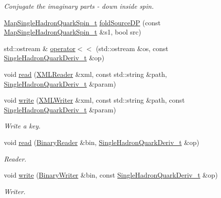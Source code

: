 \begin{DoxyCompactItemize}
\begin{DoxyCompactList}\small\item\em Conjugate the imaginary parts -\/ down inside spin. \end{DoxyCompactList}\item 
\mbox{\hyperlink{namespaceHadron_a22279e56b59508dc8dd2c8991dc911fd}{Map\+Single\+Hadron\+Quark\+Spin\+\_\+t}} \mbox{\hyperlink{namespaceHadron_a3ea046027140669df443a45763de3e2c}{fold\+Source\+DP}} (const \mbox{\hyperlink{namespaceHadron_a22279e56b59508dc8dd2c8991dc911fd}{Map\+Single\+Hadron\+Quark\+Spin\+\_\+t}} \&s1, bool src)
\item 
std\+::ostream \& \mbox{\hyperlink{namespaceHadron_af6547a2cdd6369eda030067e469096bf}{operator$<$$<$}} (std\+::ostream \&os, const \mbox{\hyperlink{structHadron_1_1SingleHadronQuarkDeriv__t}{Single\+Hadron\+Quark\+Deriv\+\_\+t}} \&op)
\item 
void \mbox{\hyperlink{namespaceHadron_a0b9e3ade4af9d7765000d9cd6477956e}{read}} (\mbox{\hyperlink{classADATXML_1_1XMLReader}{X\+M\+L\+Reader}} \&xml, const std\+::string \&path, \mbox{\hyperlink{structHadron_1_1SingleHadronQuarkDeriv__t}{Single\+Hadron\+Quark\+Deriv\+\_\+t}} \&param)
\item 
void \mbox{\hyperlink{namespaceHadron_a2e0c9a892aa8790addf90c28db1eaf28}{write}} (\mbox{\hyperlink{classADATXML_1_1XMLWriter}{X\+M\+L\+Writer}} \&xml, const std\+::string \&path, const \mbox{\hyperlink{structHadron_1_1SingleHadronQuarkDeriv__t}{Single\+Hadron\+Quark\+Deriv\+\_\+t}} \&param)
\begin{DoxyCompactList}\small\item\em Write a key. \end{DoxyCompactList}\item 
void \mbox{\hyperlink{namespaceHadron_ad5dee2ca1e22f01bd860ef607035e36f}{read}} (\mbox{\hyperlink{classADATIO_1_1BinaryReader}{Binary\+Reader}} \&bin, \mbox{\hyperlink{structHadron_1_1SingleHadronQuarkDeriv__t}{Single\+Hadron\+Quark\+Deriv\+\_\+t}} \&op)
\begin{DoxyCompactList}\small\item\em Reader. \end{DoxyCompactList}\item 
void \mbox{\hyperlink{namespaceHadron_aca06b6220f81ed284c829138c237b84e}{write}} (\mbox{\hyperlink{classADATIO_1_1BinaryWriter}{Binary\+Writer}} \&bin, const \mbox{\hyperlink{structHadron_1_1SingleHadronQuarkDeriv__t}{Single\+Hadron\+Quark\+Deriv\+\_\+t}} \&op)
\begin{DoxyCompactList}\small\item\em Writer. \end{DoxyCompactList}\item 

\end{DoxyCompactItemize}
